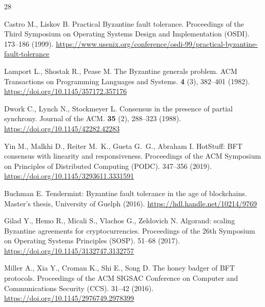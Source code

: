 
\begin{thebibliography}{28}

Castro M., Liskov B. Practical Byzantine fault tolerance. Proceedings of the
Third Symposium on Operating Systems Design and Implementation (OSDI). 173--186
(1999).
\url{https://www.usenix.org/conference/osdi-99/practical-byzantine-fault-tolerance}

Lamport L., Shostak R., Pease M. The Byzantine generals problem. ACM
Transactions on Programming Languages and Systems. \textbf{4} (3), 382--401
(1982).
\url{https://doi.org/10.1145/357172.357176}

Dwork C., Lynch N., Stockmeyer L. Consensus in the presence of partial
synchrony. Journal of the ACM. \textbf{35} (2), 288--323 (1988).
\url{https://doi.org/10.1145/42282.42283}

Yin M., Malkhi D., Reiter M.~K., Gueta G.~G., Abraham I. HotStuff: BFT consensus
with linearity and responsiveness. Proceedings of the ACM Symposium on
Principles of Distributed Computing (PODC). 347--356 (2019).
\url{https://doi.org/10.1145/3293611.3331591}

Buchman E. Tendermint: Byzantine fault tolerance in the age of blockchains.
Master's thesis, University of Guelph (2016).
\url{https://hdl.handle.net/10214/9769}

Gilad Y., Hemo R., Micali S., Vlachos G., Zeldovich N. Algorand: scaling
Byzantine agreements for cryptocurrencies. Proceedings of the 26th Symposium on
Operating Systems Principles (SOSP). 51--68 (2017).
\url{https://doi.org/10.1145/3132747.3132757}

Miller A., Xia Y., Croman K., Shi E., Song D. The honey badger of BFT protocols.
Proceedings of the ACM SIGSAC Conference on Computer and Communications Security
(CCS). 31--42 (2016).
\url{https://doi.org/10.1145/2976749.2978399}


\end{thebibliography}
